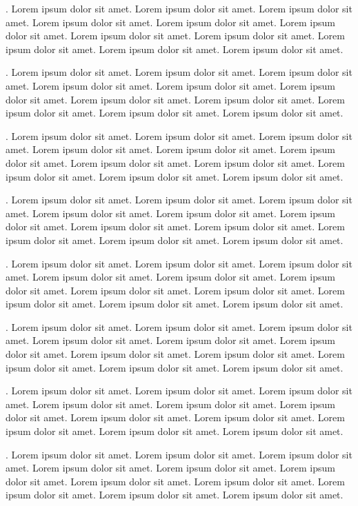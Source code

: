 . Lorem ipsum dolor sit amet. Lorem ipsum dolor sit amet. Lorem ipsum dolor sit amet. Lorem ipsum dolor sit amet. Lorem ipsum dolor sit amet. Lorem ipsum dolor sit amet. Lorem ipsum dolor sit amet. Lorem ipsum dolor sit amet. Lorem ipsum dolor sit amet. Lorem ipsum dolor sit amet. Lorem ipsum dolor sit amet. 

. Lorem ipsum dolor sit amet. Lorem ipsum dolor sit amet. Lorem ipsum dolor sit amet. Lorem ipsum dolor sit amet. Lorem ipsum dolor sit amet. Lorem ipsum dolor sit amet. Lorem ipsum dolor sit amet. Lorem ipsum dolor sit amet. Lorem ipsum dolor sit amet. Lorem ipsum dolor sit amet. Lorem ipsum dolor sit amet. 

. Lorem ipsum dolor sit amet. Lorem ipsum dolor sit amet. Lorem ipsum dolor sit amet. Lorem ipsum dolor sit amet. Lorem ipsum dolor sit amet. Lorem ipsum dolor sit amet. Lorem ipsum dolor sit amet. Lorem ipsum dolor sit amet. Lorem ipsum dolor sit amet. Lorem ipsum dolor sit amet. Lorem ipsum dolor sit amet. 

. Lorem ipsum dolor sit amet. Lorem ipsum dolor sit amet. Lorem ipsum dolor sit amet. Lorem ipsum dolor sit amet. Lorem ipsum dolor sit amet. Lorem ipsum dolor sit amet. Lorem ipsum dolor sit amet. Lorem ipsum dolor sit amet. Lorem ipsum dolor sit amet. Lorem ipsum dolor sit amet. Lorem ipsum dolor sit amet. 

. Lorem ipsum dolor sit amet. Lorem ipsum dolor sit amet. Lorem ipsum dolor sit amet. Lorem ipsum dolor sit amet. Lorem ipsum dolor sit amet. Lorem ipsum dolor sit amet. Lorem ipsum dolor sit amet. Lorem ipsum dolor sit amet. Lorem ipsum dolor sit amet. Lorem ipsum dolor sit amet. Lorem ipsum dolor sit amet. 

\vfil\break

\line{}
. Lorem ipsum dolor sit amet. Lorem ipsum dolor sit amet. Lorem ipsum dolor sit amet. Lorem ipsum dolor sit amet. Lorem ipsum dolor sit amet. Lorem ipsum dolor sit amet. Lorem ipsum dolor sit amet. Lorem ipsum dolor sit amet. Lorem ipsum dolor sit amet. Lorem ipsum dolor sit amet. Lorem ipsum dolor sit amet. 

\line{}
. Lorem ipsum dolor sit amet. Lorem ipsum dolor sit amet. Lorem ipsum dolor sit amet. Lorem ipsum dolor sit amet. Lorem ipsum dolor sit amet. Lorem ipsum dolor sit amet. Lorem ipsum dolor sit amet. Lorem ipsum dolor sit amet. Lorem ipsum dolor sit amet. Lorem ipsum dolor sit amet. Lorem ipsum dolor sit amet. 

\line{}
. Lorem ipsum dolor sit amet. Lorem ipsum dolor sit amet. Lorem ipsum dolor sit amet. Lorem ipsum dolor sit amet. Lorem ipsum dolor sit amet. Lorem ipsum dolor sit amet. Lorem ipsum dolor sit amet. Lorem ipsum dolor sit amet. Lorem ipsum dolor sit amet. Lorem ipsum dolor sit amet. Lorem ipsum dolor sit amet. 

\bye
